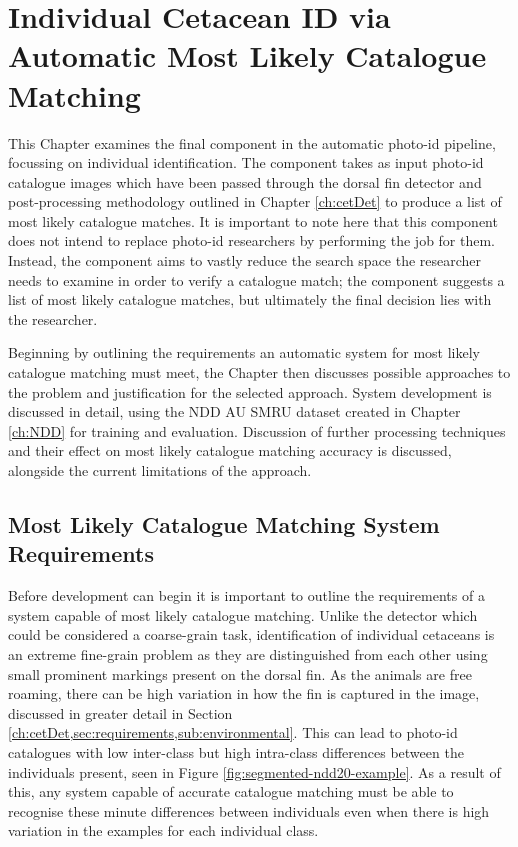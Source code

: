 \chapter{Individual Cetacean ID via Automatic Most Likely Catalogue Matching}\label{ch:ID}

This Chapter examines the final component in the automatic photo-id pipeline, focussing on individual identification. The component takes as input photo-id catalogue images which have been passed through the dorsal fin detector and post-processing methodology outlined in Chapter \ref{ch:cetDet} to produce a list of most likely catalogue matches. It is important to note here that this component does not intend to replace photo-id researchers by performing the job for them. Instead, the component aims to vastly reduce the search space the researcher needs to examine in order to verify a catalogue match; the component suggests a list of most likely catalogue matches, but ultimately the final decision lies with the researcher.

Beginning by outlining the requirements an automatic system for most likely catalogue matching must meet, the Chapter then discusses possible approaches to the problem and justification for the selected approach. System development is discussed in detail, using the NDD AU SMRU dataset created in Chapter \ref{ch:NDD} for training and evaluation. Discussion of further processing techniques and their effect on most likely catalogue matching accuracy is discussed, alongside the current limitations of the approach. 

\section{Most Likely Catalogue Matching System Requirements}\label{ch:ID,sec:Requirements}

Before development can begin it is important to outline the requirements of a system capable of most likely catalogue matching. Unlike the detector which could be considered a coarse-grain task, identification of individual cetaceans is an extreme fine-grain problem as they are distinguished from each other using small prominent markings present on the dorsal fin. As the animals are free roaming, there can be high variation in how the fin is captured in the image, discussed in greater detail in Section \ref{ch:cetDet,sec:requirements,sub:environmental}. This can lead to photo-id catalogues with low inter-class but high intra-class differences between the individuals present, seen in Figure \ref{fig:segmented-ndd20-example}. As a result of this, any system capable of accurate catalogue matching must be able to recognise these minute differences between individuals even when there is high variation in the examples for each individual class. 

